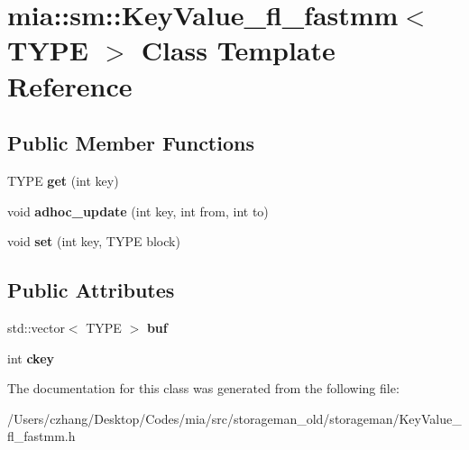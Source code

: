 \hypertarget{classmia_1_1sm_1_1_key_value__fl__fastmm}{\section{mia\-:\-:sm\-:\-:Key\-Value\-\_\-fl\-\_\-fastmm$<$ T\-Y\-P\-E $>$ Class Template Reference}
\label{classmia_1_1sm_1_1_key_value__fl__fastmm}
}
\subsection*{Public Member Functions}
\begin{DoxyCompactItemize}
\item 
\hypertarget{classmia_1_1sm_1_1_key_value__fl__fastmm_a24333a0561f8b964336ff2daccbb67c4}{T\-Y\-P\-E {\bfseries get} (int key)}\label{classmia_1_1sm_1_1_key_value__fl__fastmm_a24333a0561f8b964336ff2daccbb67c4}

\item 
\hypertarget{classmia_1_1sm_1_1_key_value__fl__fastmm_adaf38e7af4df690ab2dc2999e704e7ca}{void {\bfseries adhoc\-\_\-update} (int key, int from, int to)}\label{classmia_1_1sm_1_1_key_value__fl__fastmm_adaf38e7af4df690ab2dc2999e704e7ca}

\item 
\hypertarget{classmia_1_1sm_1_1_key_value__fl__fastmm_a4d8bfa1802f8b9b0816fe3d3bc66ec02}{void {\bfseries set} (int key, T\-Y\-P\-E block)}\label{classmia_1_1sm_1_1_key_value__fl__fastmm_a4d8bfa1802f8b9b0816fe3d3bc66ec02}

\end{DoxyCompactItemize}
\subsection*{Public Attributes}
\begin{DoxyCompactItemize}
\item 
\hypertarget{classmia_1_1sm_1_1_key_value__fl__fastmm_a61d7f11502996d4f228e7613e20366c1}{std\-::vector$<$ T\-Y\-P\-E $>$ {\bfseries buf}}\label{classmia_1_1sm_1_1_key_value__fl__fastmm_a61d7f11502996d4f228e7613e20366c1}

\item 
\hypertarget{classmia_1_1sm_1_1_key_value__fl__fastmm_a72b41a58160ec4814b409c7b0d0936e6}{int {\bfseries ckey}}\label{classmia_1_1sm_1_1_key_value__fl__fastmm_a72b41a58160ec4814b409c7b0d0936e6}

\end{DoxyCompactItemize}


The documentation for this class was generated from the following file\-:\begin{DoxyCompactItemize}
\item 
/\-Users/czhang/\-Desktop/\-Codes/mia/src/storageman\-\_\-old/storageman/Key\-Value\-\_\-fl\-\_\-fastmm.\-h\end{DoxyCompactItemize}

